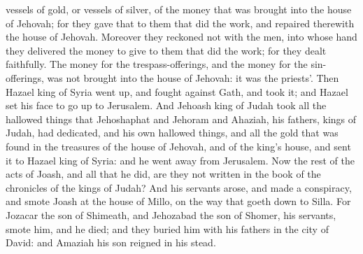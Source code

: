 vessels of gold, or vessels of silver, of the money that was brought into the house of Jehovah; for they gave that to them that did the work, and repaired therewith the house of Jehovah. Moreover they reckoned not with the men, into whose hand they delivered the money to give to them that did the work; for they dealt faithfully. The money for the trespass-offerings, and the money for the sin-offerings, was not brought into the house of Jehovah: it was the priests’.  Then Hazael king of Syria went up, and fought against Gath, and took it; and Hazael set his face to go up to Jerusalem. And Jehoash king of Judah took all the hallowed things that Jehoshaphat and Jehoram and Ahaziah, his fathers, kings of Judah, had dedicated, and his own hallowed things, and all the gold that was found in the treasures of the house of Jehovah, and of the king’s house, and sent it to Hazael king of Syria: and he went away from Jerusalem.  Now the rest of the acts of Joash, and all that he did, are they not written in the book of the chronicles of the kings of Judah? And his servants arose, and made a conspiracy, and smote Joash at the house of Millo, on the way that goeth down to Silla. For Jozacar the son of Shimeath, and Jehozabad the son of Shomer, his servants, smote him, and he died; and they buried him with his fathers in the city of David: and Amaziah his son reigned in his stead. 

